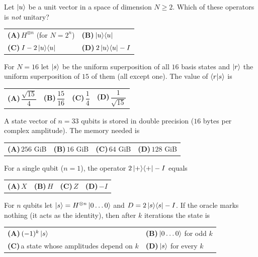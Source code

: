 \documentclass[11pt,a4paper]{article}
\newcommand{\optlabel}[1]{\textbf{(#1)}}
\newenvironment{qitem}[1]{\begin{list}{}{\setlength{\leftmargin}{3.3em}\setlength{\labelwidth}{3.1em}%
  \setlength{\labelsep}{0.2em}\setlength{\topsep}{3pt}\setlength{\parsep}{3pt}}\item[\textbf{Q.#1}\hfill]}{\end{list}}
\newcommand{\qsep}{\par\vspace{2pt}{\color{black!15}\hrule}\vspace{4pt}}
\begin{document}
\begin{qitem}{30}
Let $\ket{u}$ be a unit vector in a space of dimension $N \ge 2$. Which of these operators is \emph{not} unitary?
\par\smallskip\noindent\begin{tabularx}{\linewidth}{@{}*{2}{L}@{}}
\optlabel{A}\,$H^{\otimes n}$ (for $N = 2^n$) & \optlabel{B}\,$\ket{u}\!\bra{u}$ \\[3pt]
\optlabel{C}\,$I - 2\ket{u}\!\bra{u}$ & \optlabel{D}\,$2\ket{u}\!\bra{u} - I$
\end{tabularx}
\end{qitem}
\qsep

\begin{qitem}{31}
For $N = 16$ let $\ket{s}$ be the uniform superposition of all $16$ basis states and $\ket{r}$ the uniform superposition of $15$ of them (all except one). The value of $\braket{r|s}$ is
\par\smallskip\noindent\begin{tabularx}{\linewidth}{@{}*{4}{L}@{}}
\optlabel{A}\,$\dfrac{\sqrt{15}}{4}$ & \optlabel{B}\,$\dfrac{15}{16}$ & \optlabel{C}\,$\dfrac14$ & \optlabel{D}\,$\dfrac{1}{\sqrt{15}}$
\end{tabularx}
\end{qitem}
\qsep

\begin{qitem}{32}
A state vector of $n = 33$ qubits is stored in double precision ($16$ bytes per complex amplitude). The memory needed is
\par\smallskip\noindent\begin{tabularx}{\linewidth}{@{}*{4}{L}@{}}
\optlabel{A}\,$256$ GiB & \optlabel{B}\,$16$ GiB & \optlabel{C}\,$64$ GiB & \optlabel{D}\,$128$ GiB
\end{tabularx}
\end{qitem}
\qsep

\begin{qitem}{33}
For a single qubit ($n = 1$), the operator $2\ket{+}\!\bra{+} - I$ equals
\par\smallskip\noindent\begin{tabularx}{\linewidth}{@{}*{4}{L}@{}}
\optlabel{A}\,$X$ & \optlabel{B}\,$H$ & \optlabel{C}\,$Z$ & \optlabel{D}\,$-I$
\end{tabularx}
\end{qitem}
\qsep

\begin{qitem}{34}
For $n$ qubits let $\ket{s} = H^{\otimes n}\ket{0\dots0}$ and $D = 2\ket{s}\!\bra{s} - I$. If the oracle marks nothing (it acts as the identity), then after $k$ iterations the state is
\par\smallskip\noindent\begin{tabularx}{\linewidth}{@{}*{2}{L}@{}}
\optlabel{A}\,$(-1)^k\ket{s}$ & \optlabel{B}\,$\ket{0\dots0}$ for odd $k$ \\[3pt]
\optlabel{C}\,a state whose amplitudes depend on $k$ & \optlabel{D}\,$\ket{s}$ for every $k$
\end{tabularx}
\end{qitem}
\qsep
\end{document}

